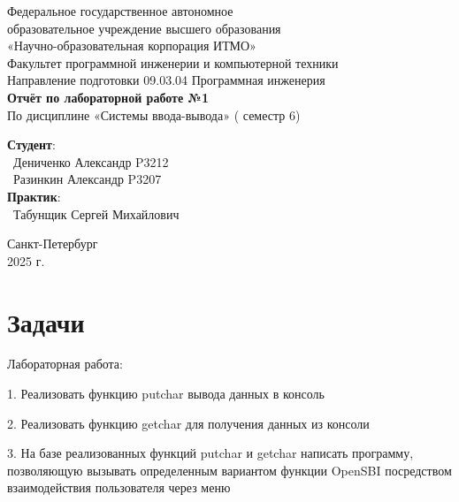 \documentclass{article}
\begin{document}
\begin{center}
    \Large
    Федеральное государственное автономное \\
    образовательное учреждение высшего образования \\ 
    «Научно-образовательная корпорация ИТМО»\\
    \vspace{0.5cm}
    \large
    Факультет программной инженерии и компьютерной техники \\
    Направление подготовки 09.03.04 Программная инженерия \\
    \vspace{1cm}
    \Large
    \textbf{Отчёт по лабораторной работе №1} \\
        По дисциплине «Системы ввода-вывода» ( семестр 6)\\
    \large
    \vspace{8cm}

    \begin{minipage}{.33\textwidth}
    \end{minipage}
    \hfill
    \begin{minipage}{.4\textwidth}
    
        \textbf{Студент}: \vspace{.1cm} \\
        \ Дениченко Александр P3212\\
        \ Разинкин Александр P3207\\
        \textbf{Практик}:  \\
        \ Табунщик Сергей Михайлович
    \end{minipage}
    \vfill
Санкт-Петербург\\ 2025 г.
\end{center}
\pagestyle{empty}
\newpage
\pagestyle{plain}

\section*{Задачи}
Лабораторная работа:

1. Реализовать функцию putchar вывода данных в консоль

2. Реализовать функцию getchar для получения данных из консоли

3. На базе реализованных функций putchar и getchar написать программу,
позволяющую вызывать определенным вариантом функции OpenSBI
посредством взаимодействия пользователя через меню
\end{document}
